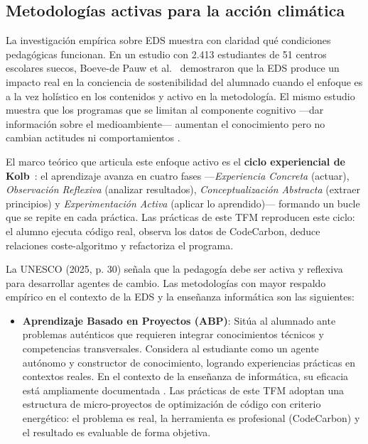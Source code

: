 \subsection{Metodologías activas para la acción climática}


La investigación empírica sobre EDS muestra con claridad qué condiciones pedagógicas funcionan. En un estudio con 2.413 estudiantes de 51 centros escolares suecos, Boeve-de Pauw et al.~\cite{boevedepauw2015effectiveness} demostraron que la EDS produce un impacto real en la conciencia de sostenibilidad del alumnado cuando el enfoque es a la vez holístico en los contenidos y activo en la metodología. El mismo estudio muestra que los programas que se limitan al componente cognitivo —dar información sobre el medioambiente— aumentan el conocimiento pero no cambian actitudes ni comportamientos \cite{boevedepauw2015effectiveness}.

El marco teórico que articula este enfoque activo es el \textbf{ciclo experiencial de Kolb}~\cite{kolb1984experiential}: el aprendizaje avanza en cuatro fases —\textit{Experiencia Concreta} (actuar), \textit{Observación Reflexiva} (analizar resultados), \textit{Conceptualización Abstracta} (extraer principios) y \textit{Experimentación Activa} (aplicar lo aprendido)— formando un bucle que se repite en cada práctica. Las prácticas de este TFM reproducen este ciclo: el alumno ejecuta código real, observa los datos de CodeCarbon, deduce relaciones coste-algoritmo y refactoriza el programa.


La UNESCO (2025, p. 30) señala que la pedagogía debe ser activa y reflexiva para desarrollar agentes de cambio. Las metodologías con mayor respaldo empírico en el contexto de la EDS y la enseñanza informática son las siguientes:


\begin{itemize}
\item \textbf{Aprendizaje Basado en Proyectos (ABP)}: Sitúa al alumnado ante problemas auténticos que requieren integrar conocimientos técnicos y competencias transversales. Considera al estudiante como un agente autónomo y constructor de conocimiento, logrando experiencias prácticas en contextos reales. En el contexto de la enseñanza de informática, su eficacia está ampliamente documentada \cite{kokotsaki2016project}. Las prácticas de este TFM adoptan una estructura de micro-proyectos de optimización de código con criterio energético: el problema es real, la herramienta es profesional (CodeCarbon) y el resultado es evaluable de forma objetiva.
\end{itemize}


